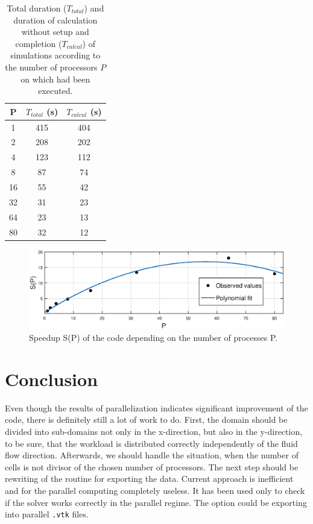 \documentclass[a4paper, 10pt]{article}
\begin{document}
\begingroup
\renewcommand*{\arraystretch}{1.5}
\begin{table}[h!]
	\centering
	\begin{tabular}{  c | c | c }
		P & $ T_{total} $ (s) & $ T_{calcul} $ (s) \\
		\hline \hline
		1 & 415 & 404 \\ \hline
		2 & 208 & 202 \\ \hline
		4 & 123 & 112 \\ \hline
		8 & 87 & 74 \\ \hline
		16 & 55 & 42 \\ \hline
		32 & 31 & 23 \\ \hline
		64 & 23 & 13 \\ \hline
		80 & 32 & 12 \\
	\end{tabular}
	\caption{Total duration ($ T_{total} $) and duration of calculation without setup and completion ($ T_{calcul} $) of simulations according to the number of processors $ P $ on which had been executed.}
	\label{2.3.16}
\end{table}
\endgroup

\begin{figure}[h!]
	\centering
	\includegraphics[width=0.9\linewidth]{img/2.eps}
	\caption{Speedup S(P) of the code depending on the number of processes P.}
\end{figure}


\section{Conclusion}

Even though the results of parallelization indicates significant improvement of the code, there is definitely still a lot of work to do. First, the domain should be divided into sub-domains not only in the x-direction, but also in the y-direction, to be sure, that the workload is distributed correctly independently of the fluid flow direction. Afterwards, we should handle the situation, when the number of cells is not divisor of the chosen number of processors. The next step should be rewriting of the routine for exporting the data. Current approach is inefficient and for the parallel computing completely useless. It has been used only to check if the solver works correctly in the parallel regime. The option could be exporting into parallel \texttt{.vtk} files.\\
\end{document}
